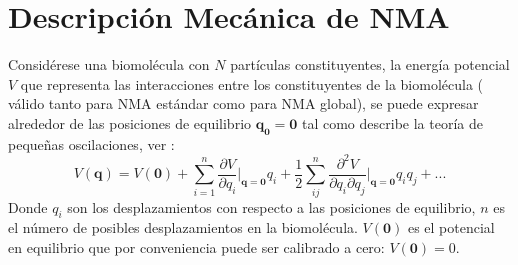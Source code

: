 \section{Descripci\'{o}n Mec\'{a}nica de NMA}

Consid\'{e}rese una biomol\'{e}cula con $N$ part\'{i}culas constituyentes, la energ\'{i}a potencial $V$ que representa las interacciones entre los constituyentes de la biomol\'{e}cula ( v\'{a}lido tanto para NMA est\'{a}ndar como para NMA global), se puede expresar alrededor de las posiciones de equilibrio $\mathbf{q_0}=\mathbf{0}$ tal como describe la teor\'{i}a de peque\~{n}as oscilaciones, ver \cite{Goldstein2001}:
\begin{equation}\label{eq:1}
V(\mathbf{q})=V(\mathbf{0})+\sum_{i=1}^n\frac{\partial V}{\partial q_i}\bigg|_{\mathbf{q}=\mathbf{0}}q_i+\frac{1}{2}\sum_{ij}^{n}\frac{\partial^2 V }{\partial q_i\partial q_j}\bigg|_{\mathbf{q}=\mathbf{0}}q_i q_j+...
\end{equation}
Donde $q_i$ son los desplazamientos con respecto a las posiciones de equilibrio, $n$ es el n\'{u}mero de posibles desplazamientos en la biomol\'{e}cula. $V(\mathbf{0})$ es el potencial en equilibrio que por conveniencia puede ser calibrado a cero: $V(\mathbf{0})=0$. \\


